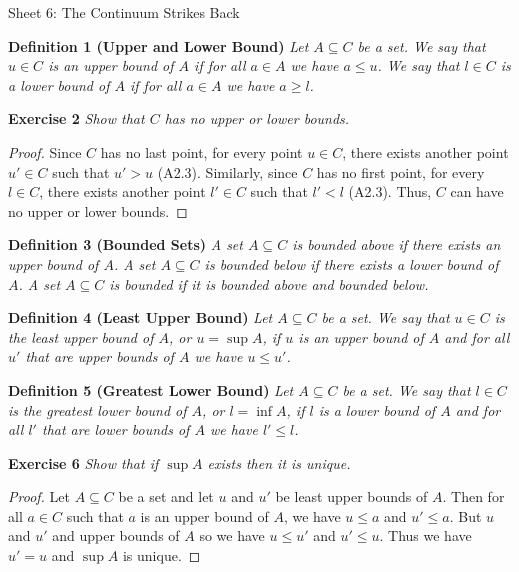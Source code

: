 \documentclass{article}
\begin{document}
\begin{flushleft}

\Large

Sheet 6: The Continuum Strikes Back\newline

\normalsize

\textbf{Definition 1 (Upper and Lower Bound)}
\textsl{Let $A \subseteq C$ be a set. We say that $u \in C$ is an upper bound of $A$ if for all $a \in A$ we have $a \leq u$. We say that $l \in C$ is a lower bound of $A$ if for all $a \in A$ we have $a \geq l$.}\newline

\textbf{Exercise 2}
\textsl{Show that $C$ has no upper or lower bounds.}
\begin{proof}
Since $C$ has no last point, for every point $u \in C$, there exists another point $u' \in C$ such that $u'>u$ (A2.3). Similarly, since $C$ has no first point, for every $l \in C$, there exists another point $l' \in C$ such that $l'<l$ (A2.3). Thus, $C$ can have no upper or lower bounds.
\end{proof}

\textbf{Definition 3 (Bounded Sets)}
\textsl{A set $A \subseteq C$ is bounded above if there exists an upper bound of $A$. A set $A \subseteq C$ is bounded below if there exists a lower bound of $A$. A set $A \subseteq C$ is bounded if it is bounded above and bounded below.}\newline

\textbf{Definition 4 (Least Upper Bound)}
\textsl{Let $A \subseteq C$ be a set. We say that $u \in C$ is the least upper bound of $A$, or $u = \sup A$, if $u$ is an upper bound of $A$ and for all $u'$ that are upper bounds of $A$ we have $u \leq u'$.}\newline

\textbf{Definition 5 (Greatest Lower Bound)}
\textsl{Let $A \subseteq C$ be a set. We say that $l \in C$ is the greatest lower bound of $A$, or $l = \inf A$, if $l$ is a lower bound of $A$ and for all $l'$ that are lower bounds of $A$ we have $l' \leq l$.}
\newline

\textbf{Exercise 6}
\textsl{Show that if $\sup A$ exists then it is unique.}
\begin{proof}
Let $A \subseteq C$ be a set and let $u$ and $u'$ be least upper bounds of $A$. Then for all $a \in C$ such that $a$ is an upper bound of $A$, we have $u \leq a$ and $u' \leq a$. But $u$ and $u'$ and upper bounds of $A$ so we have $u \leq u'$ and $u' \leq u$. Thus we have $u' = u$ and $\sup A$ is unique.
\end{proof}


\end{flushleft}
\end{document}
